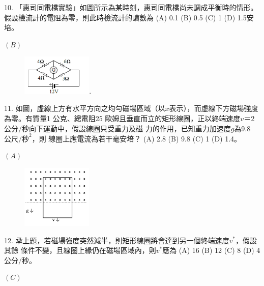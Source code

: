 \documentclass[cn,10pt,math=newtx,chinesefont=founder,device=ig]{elegantbook}
\begin{document}
\begin{example}
   10. 「惠司同電橋實驗」如圖所示為某時刻，惠司同電橋尚未調成平衡時的情形。假設檢流計的電阻為零，則此時檢流計的讀數為 (A) 0.1 (B) 0.5 (C) 1 (D) 1.5安培。\\
    \rightline{[全國聯招教甄109]}
\end{example}
\begin{solution}
    $(B)$
\end{solution}
\begin{figure}[htbp]
    \flushright
    \includegraphics[width=0.3\textwidth]{image/109全國10.png}.
  \end{figure}
\newpage


\begin{example}
   11. 如圖，虛線上方有水平方向之均勻磁場區域（以$x$表示），而虛線下方磁場強度為零。有質量1 公克、總電阻25 歐姆且垂直而立的矩形線圈，正以終端速度$v＝$2 $公分/秒$向下運動中，假設線圈只受重力及磁
力的作用，已知重力加速度$g$為9.8$公尺/秒^2$，則
線圈上應電流為若干毫安培？ (A) 2.8 (B) 9.8
(C) 1 (D) 1.4。\\
    \rightline{[全國聯招教甄109]}
\end{example}
\begin{solution}
    $(A)$
\end{solution}
\begin{figure}[htbp]
    \flushright
    \includegraphics[width=0.3\textwidth]{image/109全國11.png}
  \end{figure}
\newpage


\begin{example}
   12. 承上題，若磁場強度突然減半，則矩形線圈將會達到另一個終端速度$v^*$，假設其餘
條件不變，且線圈上緣仍在磁場區域內，則$v^*$應為 (A) 16 (B) 12 (C) 8 (D) 4 $公分/秒$。\\
    \rightline{[全國聯招教甄109]}
\end{example}
\begin{solution}
    $(C)$
\end{solution}
\end{document}
